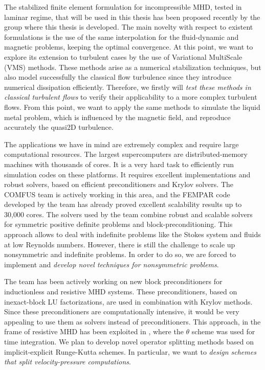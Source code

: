 The stabilized finite element formulation for incompressible MHD, tested in laminar regime, that will be used in this thesis has been proposed recently by the group where this thesis is developed. The main novelty with respect to existent formulations is the use of the same interpolation for the fluid-dynamic and magnetic problems, keeping the optimal convergence. At this point, we want to explore its extension to turbulent cases by the use of Variational MultiScale (VMS) methods. These methods arise as a numerical stabilization techniques, but also model successfully the classical flow turbulence since they introduce numerical dissipation efficiently. Therefore, we firstly will \emph{test these methods in classical turbulent flows} to verify their applicability to a more complex turbulent flows. From this point, we want to apply the same methods to simulate the liquid metal problem, which is influenced by the magnetic field, and reproduce accurately the quasi2D turbulence.

The applications we have in mind are extremely complex and require large computational resources. The largest supercomputers are distributed-memory machines with thousands of cores. It is a very hard task to efficiently run simulation codes on these platforms. It requires excellent implementations and robust solvers, based on efficient preconditioners and Krylov solvers. The COMFUS team is actively working in this area, and the FEMPAR code developed by the team has already proved excellent scalability results up to 30,000 cores. The solvers used by the team combine robust and scalable solvers for symmetric positive definite problems and block-preconditioning. This approach allows to deal with indefinite problems like the Stokes system and fluids at low Reynolds numbers. However, there is still the challenge to scale up nonsymmetric and indefinite problems. In order to do so, we are forced to implement and \emph{develop novel techniques for nonsymmetric problems}.

The team has been actively working on new block preconditioners for inductionless and resistive MHD systems. These preconditioners, based on inexact-block LU factorizations, are used in combination with Krylov methods. Since these preconditioners are computationally intensive, it would be very appealing to use them as solvers instead of preconditioners. This approach, in the frame of resistive MHD has been exploited in \cite{badia_unconditionally_2012}, where the $\theta$ scheme was used for time integration. We plan to develop novel operator splitting methods based on implicit-explicit Runge-Kutta schemes. In particular, we want to \emph{design schemes that split velocity-pressure computations}.

